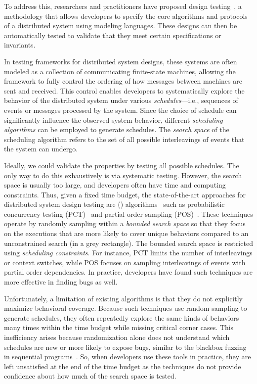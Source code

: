To address this, researchers and practitioners have proposed design testing~\cite{Desai13-P, Leslie94-tla}, a methodology that allows developers to specify the core algorithms and protocols of a distributed system using modeling languages. These designs can then be automatically tested to validate that they meet certain specifications or invariants.

In testing frameworks for distributed system designs, these systems are often modeled as a collection of communicating finite-state machines, allowing the framework to fully control the ordering of how messages between machines are sent and received. This control enables developers to systematically explore the behavior of the distributed system under various \emph{schedules}—i.e., sequences of events or messages processed by the system. Since the choice of schedule can significantly influence the observed system behavior, different \emph{scheduling algorithms} can be employed to generate schedules. The \emph{search space} of the scheduling algorithm refers to the set of all possible interleavings of events that the system can undergo. 

Ideally, we could validate the properties by testing all possible schedules. The only way to do this exhaustively is via systematic testing. However, the search space is usually too large, and developers often have time and computing constraints. Thus, given a fixed time budget, the state-of-the-art approaches for distributed system design testing are {\RSBT} ({\RSBTShort}) algorithms~\cite{Yuan18-POS,Burckhardt10-PCT,Yuan20-morpheus} such as probabilistic concurrency testing (PCT)~\cite{Burckhardt10-PCT} and partial order sampling (POS)~\cite{Yuan18-POS}. These techniques operate by randomly sampling within a \emph{bounded search space} so that they focus on the executions that are more likely to cover unique behaviors compared to an unconstrained search (in a grey rectangle). The bounded search space is restricted using \emph{scheduling constraints}. For instance, PCT limits the number of interleavings or context switches, while POS focuses on sampling interleavings of events with partial order dependencies. In practice, developers have found such techniques are more effective in finding bugs as well. 

Unfortunately, a limitation of existing {\RSBTShort} algorithms is that they do not explicitly maximize behavioral coverage. Because such techniques use random sampling to generate schedules, they often repeatedly explore the same kinds of behaviors many times within the time budget while missing critical corner cases. This inefficiency arises because randomization alone does not understand which schedules are new or more likely to expose bugs, similar to the blackbox fuzzing in sequential programs~\cite{Bohme16-aflfast}. So, when developers use these tools in practice, they are left unsatisfied at the end of the time budget as the techniques do not provide confidence about how much of the search space is tested.

